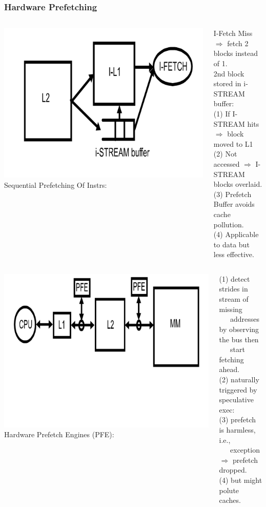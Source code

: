 \documentclass{beamer}
\begin{document}
\begin{frame}[fragile,t]
\frametitle{Hardware Prefetching}

\begin{columns}
\includegraphics[width=27ex]{FigsMemH/SeqPrefetching}
Sequential Prefetching Of Instrs:\smallskip
\begin{scriptsize}
I-Fetch Miss $\Rightarrow$ fetch 2 blocks instead of 1.\\\smallskip
2nd block stored in i-STREAM buffer:\\
(1) If I-STREAM hits $\Rightarrow$ block moved to L1\\
(2) Not accessed $\Rightarrow$ I-STREAM blocks overlaid.\\
(3) Prefetch Buffer avoids cache pollution.\\
(4) Applicable to data but less effective.
\end  {scriptsize}
\end{columns}

\begin{columns}
\includegraphics[width=33ex]{FigsMemH/HwdPrefetching}
Hardware Prefetch Engines (PFE):\\\smallskip
\begin{scriptsize}
(1) detect strides in stream of missing\\ 
{\tt~~~}addresses by observing the bus then\\
{\tt~~~}start fetching ahead.\\
(2) naturally triggered by speculative exec:\\ 
(3) prefetch is harmless, i.e.,\\
{\tt~~~}exception $\Rightarrow$ prefetch dropped.\\
(4) but might polute caches.
\end  {scriptsize}
\end{columns}

\end{frame}
\end{document}
